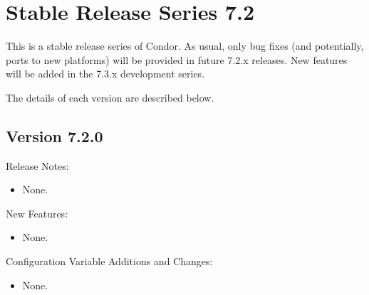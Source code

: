 
\section{\label{sec:History-7-2}Stable Release Series 7.2}

This is a stable release series of Condor.
As usual, only bug fixes (and potentially, ports to new platforms)
will be provided in future 7.2.x releases.
New features will be added in the 7.3.x development series.

The details of each version are described below.


\subsection*{\label{sec:New-7-2-0}Version 7.2.0}

\noindent Release Notes:

\begin{itemize}

\item None.

\end{itemize}


\noindent New Features:

\begin{itemize}

\item None.

\end{itemize}

\noindent Configuration Variable Additions and Changes:

\begin{itemize}

\item None.

\end{itemize}

